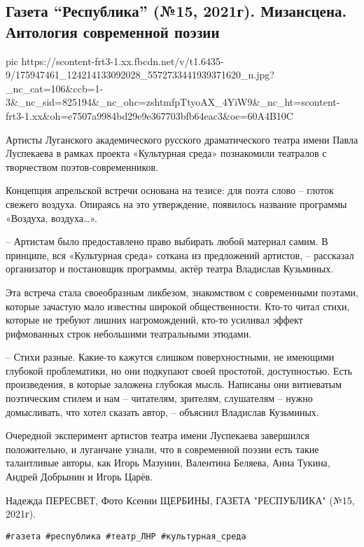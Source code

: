  
 
 
 
 

\subsection{Газета \enquote{Республика} (№15, 2021г).  Мизансцена.  Антология современной поэзии}

\ifcmt
  pic https://scontent-frt3-1.xx.fbcdn.net/v/t1.6435-9/175947461_124214133092028_5572733441939371620_n.jpg?_nc_cat=106&ccb=1-3&_nc_sid=825194&_nc_ohc=zshtmfpTtyoAX_4YiW9&_nc_ht=scontent-frt3-1.xx&oh=e7507a9984bd29e9e367703bfb64eac3&oe=60A4B10C
\fi

Артисты Луганского академического русского драматического театра имени Павла
Луспекаева в рамках проекта «Культурная среда» познакомили театралов с
творчеством поэтов-современников.

Концепция апрельской встречи основана на тезисе: для поэта слово – глоток
свежего воздуха. Опираясь на это утверждение, появилось название программы
«Воздуха, воздуха…».

– Артистам было предоставлено право выбирать любой материал самим. В принципе,
вся «Культурная среда» соткана из предложений артистов, – рассказал организатор
и постановщик программы, актёр театра Владислав Кузьминых.

Эта встреча стала своеобразным ликбезом, знакомством с современными поэтами,
которые зачастую мало известны широкой общественности. Кто-то читал стихи,
которые не требуют лишних нагромождений, кто-то усиливал эффект рифмованных
строк небольшими театральными этюдами.

– Стихи разные. Какие-то кажутся слишком поверхностными, не имеющими глубокой
проблематики, но они подкупают своей простотой, доступностью. Есть
произведения, в которые заложена глубокая мысль. Написаны они витиеватым
поэтическим стилем и нам – читателям, зрителям, слушателям – нужно домысливать,
что хотел сказать автор, – объяснил Владислав Кузьминых.

Очередной эксперимент артистов театра имени Луспекаева завершился положительно,
и луганчане узнали, что в современной поэзии есть такие талантливые авторы, как
Игорь Мазунин, Валентина Беляева, Анна Тукина, Андрей Добрынин и Игорь Царёв.

Надежда ПЕРЕСВЕТ, Фото Ксении ЩЕРБИНЫ, ГАЗЕТА "РЕСПУБЛИКА" (№15, 2021г).

\verb|#газета #республика #театр_ЛНР #культурная_среда|

